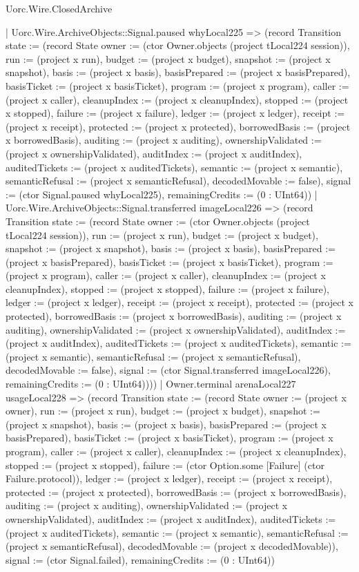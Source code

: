 \begin{lexlean}{Uorc.Wire.ClosedArchive}
\begin{semanticmodule}
{      | Uorc.Wire.ArchiveObjects::Signal.paused whyLocal225 => (record Transition {state := (record State {owner := (ctor Owner.objects (project tLocal224 session)), run := (project x run), budget := (project x budget), snapshot := (project x snapshot), basis := (project x basis), basisPrepared := (project x basisPrepared), basisTicket := (project x basisTicket), program := (project x program), caller := (project x caller), cleanupIndex := (project x cleanupIndex), stopped := (project x stopped), failure := (project x failure), ledger := (project x ledger), receipt := (project x receipt), protected := (project x protected), borrowedBasis := (project x borrowedBasis), auditing := (project x auditing), ownershipValidated := (project x ownershipValidated), auditIndex := (project x auditIndex), auditedTickets := (project x auditedTickets), semantic := (project x semantic), semanticRefusal := (project x semanticRefusal), decodedMovable := false}), signal := (ctor Signal.paused whyLocal225), remainingCredits := (0 : UInt64)})
      | Uorc.Wire.ArchiveObjects::Signal.transferred imageLocal226 => (record Transition {state := (record State {owner := (ctor Owner.objects (project tLocal224 session)), run := (project x run), budget := (project x budget), snapshot := (project x snapshot), basis := (project x basis), basisPrepared := (project x basisPrepared), basisTicket := (project x basisTicket), program := (project x program), caller := (project x caller), cleanupIndex := (project x cleanupIndex), stopped := (project x stopped), failure := (project x failure), ledger := (project x ledger), receipt := (project x receipt), protected := (project x protected), borrowedBasis := (project x borrowedBasis), auditing := (project x auditing), ownershipValidated := (project x ownershipValidated), auditIndex := (project x auditIndex), auditedTickets := (project x auditedTickets), semantic := (project x semantic), semanticRefusal := (project x semanticRefusal), decodedMovable := false}), signal := (ctor Signal.transferred imageLocal226), remainingCredits := (0 : UInt64)})))
    | Owner.terminal arenaLocal227 usageLocal228 => (record Transition {state := (record State {owner := (project x owner), run := (project x run), budget := (project x budget), snapshot := (project x snapshot), basis := (project x basis), basisPrepared := (project x basisPrepared), basisTicket := (project x basisTicket), program := (project x program), caller := (project x caller), cleanupIndex := (project x cleanupIndex), stopped := (project x stopped), failure := (ctor Option.some [Failure] (ctor Failure.protocol)), ledger := (project x ledger), receipt := (project x receipt), protected := (project x protected), borrowedBasis := (project x borrowedBasis), auditing := (project x auditing), ownershipValidated := (project x ownershipValidated), auditIndex := (project x auditIndex), auditedTickets := (project x auditedTickets), semantic := (project x semantic), semanticRefusal := (project x semanticRefusal), decodedMovable := (project x decodedMovable)}), signal := (ctor Signal.failed), remainingCredits := (0 : UInt64)})
}
\end{semanticmodule}
\end{lexlean}
